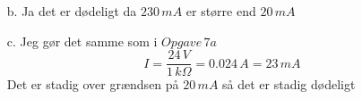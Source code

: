 \documentclass[12pt]{article}
\begin{document}
\begin{itemize}
\begin{enumerate}
    \item[b.] Ja det er dødeligt da $230\, mA$ er større end $20\, mA$\\
    \item[c.] Jeg gør det samme som i $Opgave\, 7a$
    $$
    I = \frac{24\, V}{1\, k\Omega} = 0.024\, A = 23\, mA
    $$
    Det er stadig over grændsen på $20\, mA$ så det er stadig dødeligt
  \end{enumerate}
\end{itemize}
\end{document}
